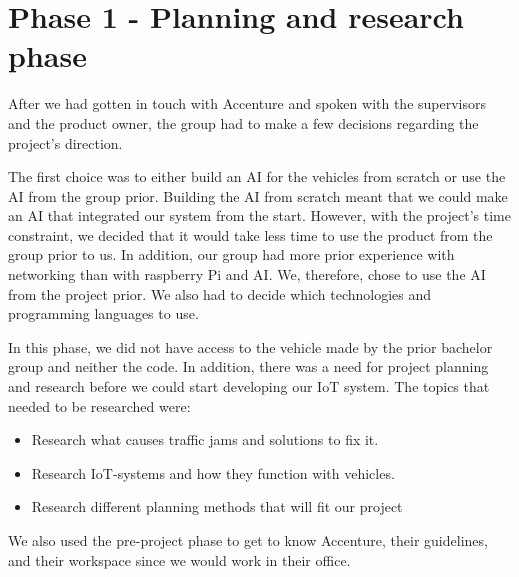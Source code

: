 \section{Phase 1 - Planning and research phase}

After we had gotten in touch with Accenture and spoken with the supervisors and the product owner, the group had to make a few decisions regarding the project's direction.

The first choice was to either build an AI for the vehicles from scratch or use the AI from the group prior. Building the AI from scratch meant that we could make an AI that integrated our system from the start. However, with the project's time constraint, we decided that it would take less time to use the product from the group prior to us. In addition, our group had more prior experience with networking than with raspberry Pi and AI. We, therefore, chose to use the AI from the project prior. We also had to decide which technologies and programming languages to use.

In this phase, we did not have access to the vehicle made by the prior bachelor group and neither the code. In addition, there was a need for project planning and research before we could start developing our IoT system. The topics that needed to be researched were:

\begin{itemize}
\item Research what causes traffic jams and solutions to fix it.
\item Research IoT-systems and how they function with vehicles.
\item Research different planning methods that will fit our project
\end{itemize}
We also used the pre-project phase to get to know Accenture, their guidelines, and their workspace since we would work in their office.








\clearpage
